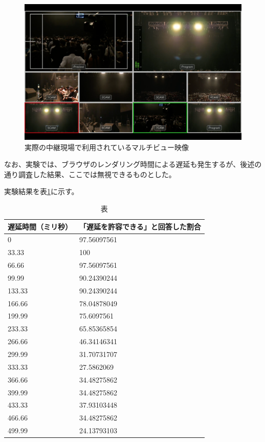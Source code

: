 \begin{figure}[htbp]
  \begin{center}
    \includegraphics[bb=0 0 1680 1050,width=14cm]{img/mv-delay-actual.png}
  \end{center}
  \caption{実際の中継現場で利用されているマルチビュー映像}
  \label{fig:mv-delay-actual}
\end{figure}

なお、実験では、ブラウザのレンダリング時間による遅延も発生するが、後述の通り調査した結果、ここでは無視できるものとした。

実験結果を表\ref{tb:mv-delay-result}に示す。

\begin{table}[htbp]
  \caption{表}
  \label{tb:mv-delay-result}
  \begin{center}
  \begin{tabular}{l|l}
    \hline
    遅延時間（ミリ秒） & 「遅延を許容できる」と回答した割合 \\\hline\hline
    0               & 97.56097561 \\\hline
    33.33           & 100         \\\hline
    66.66           & 97.56097561 \\\hline
    99.99           & 90.24390244 \\\hline
    133.33          & 90.24390244 \\\hline
    166.66          & 78.04878049 \\\hline
    199.99          & 75.6097561  \\\hline
    233.33          & 65.85365854 \\\hline
    266.66          & 46.34146341 \\\hline
    299.99          & 31.70731707 \\\hline
    333.33          & 27.5862069  \\\hline
    366.66          & 34.48275862 \\\hline
    399.99          & 34.48275862 \\\hline
    433.33          & 37.93103448 \\\hline
    466.66          & 34.48275862 \\\hline
    499.99          & 24.13793103 \\\hline
  \end{tabular}\end{center}
\end{table}


